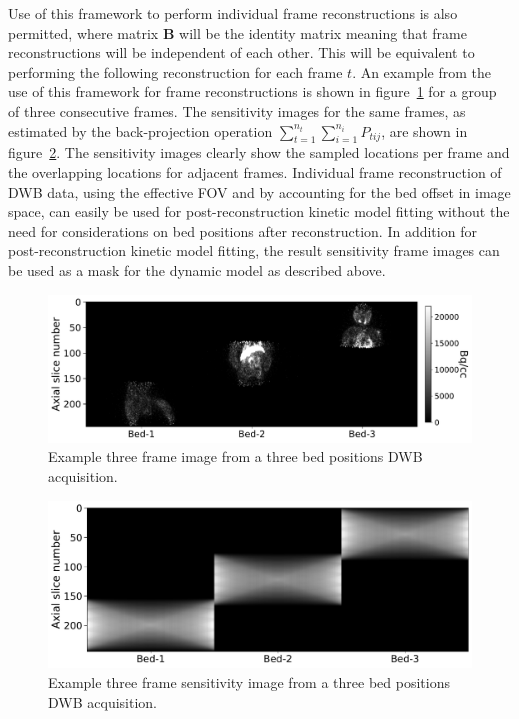 Use of this framework to perform individual frame reconstructions is also permitted, where matrix $\boldsymbol{B}$ will be the identity matrix meaning that frame reconstructions will be independent of each other. This will be equivalent to performing the following reconstruction for each frame $t$. 
An example from the use of this framework for frame reconstructions is shown in figure~\ref{fig_3_3:Macaque} for a group of three consecutive frames. The sensitivity images for the same frames, as estimated by the back-projection operation $\sum_{t=1}^{n_t} \sum_{i=1}^{n_i} P_{tij}$, are shown in figure~\ref{fig_3_3:Macaque_Sensitivity}.
The sensitivity images clearly show the sampled locations per frame and the overlapping locations for adjacent frames. 
Individual frame reconstruction of DWB data, using the effective FOV and by accounting for the bed offset in image space, can easily be used for post-reconstruction kinetic model fitting without the need for considerations on bed positions after reconstruction. In addition for post-reconstruction kinetic model fitting, the result sensitivity frame images can be used as a mask for the dynamic model as described above. 

%
\begin{figure} [h!]
\includegraphics[scale=0.5,angle=0]{3_Results/3_3_DWB_Reconstruction/figures/Macaque_3D.pdf}
\caption{Example three frame image from a three bed positions DWB acquisition.} 
\label{fig_3_3:Macaque}
\end{figure} 
%
\begin{figure} [h!]
\includegraphics[scale=0.42,angle=0]{3_Results/3_3_DWB_Reconstruction/figures/Macaque_Sensitivity.pdf}
\caption{Example three frame sensitivity image from a three bed positions DWB acquisition.} 
\label{fig_3_3:Macaque_Sensitivity}
\end{figure} 
%

